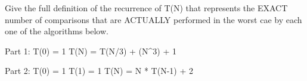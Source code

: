 Give the full definition of the recurrence of T(N) that represents the EXACT number of comparisons that are ACTUALLY performed in the worst cae by each one of the algorithms below.

Part 1: T(0) = 1
        T(N) = T(N/3) + (N^3) + 1
        
Part 2: T(0) = 1
        T(1) = 1
        T(N) = N * T(N-1) + 2
